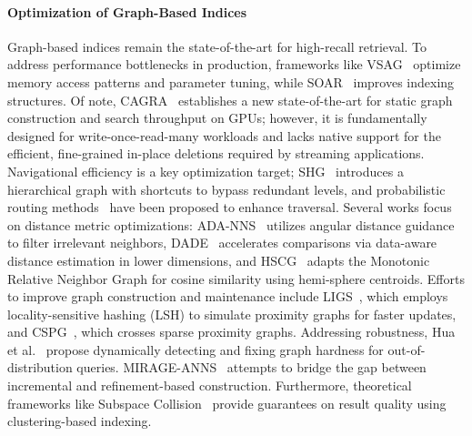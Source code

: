 \documentclass[sigconf,anonymous]{acmart}
\theoremstyle{plain}
\theoremstyle{definition}
\theoremstyle{remark}
\begin{document}
\paragraph{Optimization of Graph-Based Indices}
Graph-based indices remain the state-of-the-art for high-recall retrieval. To address performance bottlenecks in production, frameworks like VSAG~\cite{10.14778/3750601.3750624} optimize memory access patterns and parameter tuning, while SOAR~\cite{DBLP:conf/nips/SunSDGK23} improves indexing structures. 
Of note, CAGRA~\cite{10597683} establishes a new state-of-the-art for static graph construction and search throughput on GPUs; however, it is fundamentally designed for write-once-read-many workloads and lacks native support for the efficient, fine-grained in-place deletions required by streaming applications.
Navigational efficiency is a key optimization target; SHG~\cite{10.14778/3748191.3748212} introduces a hierarchical graph with shortcuts to bypass redundant levels, and probabilistic routing methods~\cite{lu2024probabilistic} have been proposed to enhance traversal. 
Several works focus on distance metric optimizations: ADA-NNS~\cite{10.1145/3696410.3714870} utilizes angular distance guidance to filter irrelevant neighbors, DADE~\cite{10.14778/3712221.3712244} accelerates comparisons via data-aware distance estimation in lower dimensions, and HSCG~\cite{10.1145/3769786} adapts the Monotonic Relative Neighbor Graph for cosine similarity using hemi-sphere centroids.
Efforts to improve graph construction and maintenance include LIGS~\cite{10.1145/3726302.3730028}, which employs locality-sensitive hashing (LSH) to simulate proximity graphs for faster updates, and CSPG~\cite{DBLP:conf/nips/YangCZ24}, which crosses sparse proximity graphs. 
Addressing robustness, Hua et al.~\cite{10.1145/3769783} propose dynamically detecting and fixing graph hardness for out-of-distribution queries. MIRAGE-ANNS~\cite{10.1145/3725325} attempts to bridge the gap between incremental and refinement-based construction. 
Furthermore, theoretical frameworks like Subspace Collision~\cite{10.1145/3709729} provide guarantees on result quality using clustering-based indexing.
\end{document}
